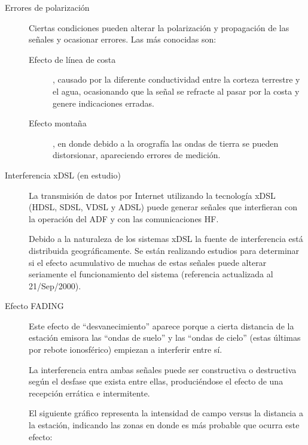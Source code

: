 \begin{description}
\begin{description}
\item [Errores de polarizaci\'on]

Ciertas condiciones pueden alterar la polarizaci\'on y propagaci\'on de las se\~nales y ocasionar errores. Las m\'as conocidas son:

\begin{description}
\item [Efecto de l\'inea de costa], causado por la diferente conductividad entre la corteza terrestre y el agua, ocasionando que la se\~nal se refracte al pasar por la costa y genere indicaciones erradas.


\item [Efecto monta\~na], en donde debido a la orograf\'ia las ondas de tierra se pueden distorsionar, apareciendo errores de medici\'on.

\end{description}


\item [Interferencia xDSL (en estudio)]

La transmisi\'on de datos por Internet utilizando la tecnolog\'ia xDSL (HDSL, SDSL, VDSL y ADSL) puede generar se\~nales que interfieran con la operaci\'on del ADF y con las comunicaciones HF.

Debido a la naturaleza de los sistemas xDSL la fuente de interferencia est\'a distribuida geogr\'aficamente. Se est\'an realizando estudios para determinar si el efecto acumulativo de muchas de estas se\~nales puede alterar seriamente el funcionamiento del sistema (referencia actualizada al 21/Sep/2000).


\item [Efecto FADING]

Este efecto de ``desvanecimiento'' aparece porque a cierta distancia de la estaci\'on emisora las ``ondas de suelo'' y las ``ondas de cielo'' (estas \'ultimas por rebote ionosf\'erico) empiezan a interferir entre s\'i.

La interferencia entra ambas se\~nales puede ser constructiva o destructiva seg\'un el desfase que exista entre ellas, produci\'endose el efecto de una recepci\'on err\'atica e intermitente.

El siguiente gr\'afico representa la intensidad de campo versus la distancia a la estaci\'on, indicando las zonas en donde es m\'as probable que ocurra este efecto:


\end{description}
\end{description}
